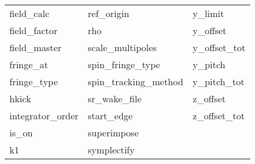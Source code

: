\begin{tabular}{lll}
field_calc                  & ref_origin                  & y_limit                     \\
field_factor                & rho                         & y_offset                    \\
field_master                & scale_multipoles            & y_offset_tot                \\
fringe_at                   & spin_fringe_type            & y_pitch                     \\
fringe_type                 & spin_tracking_method        & y_pitch_tot                 \\
hkick                       & sr_wake_file                & z_offset                    \\
integrator_order            & start_edge                  & z_offset_tot                \\
is_on                       & superimpose                 &                             \\
k1                          & symplectify                 &                             \\
 \bottomrule
 \end{tabular}
 \vfill
 
